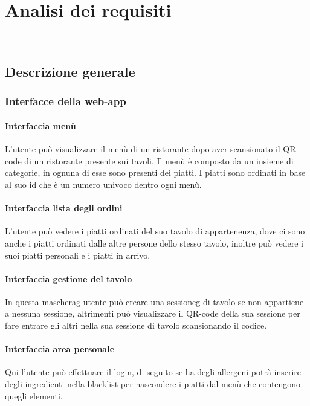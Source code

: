 
\chapter{Analisi dei requisiti}
\label{cap:analisi dei requisiti}

\\

\section{Descrizione generale}
\subsection{Interfacce della web-app}
\subsubsection{Interfaccia menù}
L'utente può visualizzare il menù di un ristorante dopo aver scansionato il QR-code di un ristorante presente sui tavoli. Il menù è composto da un insieme di categorie, in ognuna di esse sono presenti dei piatti. I piatti sono ordinati in base al suo id che è un numero univoco dentro ogni menù.
\subsubsection{Interfaccia lista degli ordini}
L'utente può vedere i piatti ordinati del suo tavolo di appartenenza, dove ci sono anche i piatti ordinati dalle altre persone dello stesso tavolo, inoltre può vedere i suoi piatti personali e i piatti in arrivo.
\subsubsection{Interfaccia gestione del tavolo}
In questa \gls{mascherag} utente può creare una \gls{sessioneg} di tavolo se non appartiene a nessuna sessione, altrimenti può visualizzare il QR-code della sua sessione per fare entrare gli altri nella sua sessione di tavolo scansionando il codice.
\subsubsection{Interfaccia area personale}
Qui l'utente può effettuare il login, di seguito se ha degli allergeni potrà inserire degli ingredienti nella blacklist per nascondere i piatti dal menù che contengono quegli elementi.

